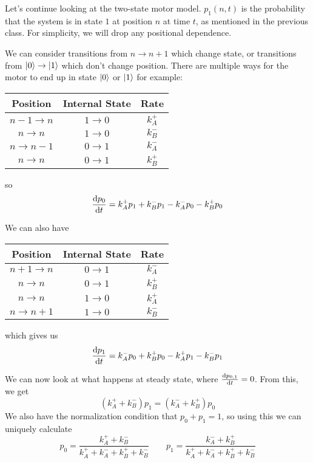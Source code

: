 \documentclass[a4paper,twoside,master.tex]{subfiles}
\begin{document}

Let's continue looking at the two-state motor model. $ p_1(n,t) $ is the probability that the system is in state $ 1 $ at position $ n $ at time $ t $, as mentioned in the previous class. For simplicity, we will drop any positional dependence.

We can consider transitions from $ n \to n + 1 $ which change state, or transitions from $\ket{0} \to\ket{1} $ which don't change position. There are multiple ways for the motor to end up in state $\ket{0} $ or $\ket{1} $ for example:
\begin{center}
    \begin{tabular}{@{}ccc@{}}
        \toprule
        Position & Internal State & Rate \\
        \midrule
        $ n - 1 \to n $ & $ 1 \to 0 $ & $ k_A^+ $ \\
        $ n \to n $ & $ 1 \to 0 $ & $ k_B^- $ \\
        $ n \to n - 1 $ & $ 0 \to 1 $ & $ k_A^- $ \\
        $ n \to n $ & $ 0 \to 1 $ & $ k_B^+ $ \\
        \bottomrule
    \end{tabular}
\end{center}
so
\begin{equation}
    \dv{p_0}{t} = k_A^+ p_1 + k_B^- p_1 - k_A^- p_0 - k_B^+ p_0
\end{equation}

We can also have
\begin{center}
    \begin{tabular}{@{}ccc@{}}
        \toprule
        Position & Internal State & Rate \\
        \midrule
        $ n + 1 \to n $ & $ 0 \to 1 $ & $ k_A^- $ \\
        $ n \to n $ & $ 0 \to 1 $ & $ k_B^+ $ \\
        $ n \to n $ & $ 1 \to 0 $ & $ k_A^+ $ \\
        $ n \to n + 1 $ & $ 1 \to 0 $ & $ k_B^- $ \\
        \bottomrule
    \end{tabular}
\end{center}
which gives us
\begin{equation}
    \dv{p_1}{t} = k_A^- p_0 + k_B^+ p_0 - k_A^+ p_1 - k_B^- p_1
\end{equation}

We can now look at what happens at steady state, where $ \dv{p_{0,1}}{t} = 0 $. From this, we get
\begin{equation}
    (k_A^+ + k_B^-)p_1 = (k_A^- + k_B^+)p_0
\end{equation}
We also have the normalization condition that $ p_0 + p_1 = 1 $, so using this we can uniquely calculate
\begin{equation}
    p_0 = \frac{k_A^+ + k_B^-}{k_A^+ + k_A^- + k_B^+ + k_B^-} \qquad p_1 = \frac{k_A^- + k_B^+}{k_A^+ + k_A^- + k_B^+ + k_B^-}
\end{equation}
\end{document}
